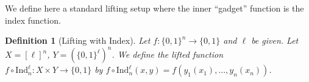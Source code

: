 \documentclass[11pt]{article}
\newtheorem{definition}{Definition}
\newcommand{\B}{\{0,1\}}
\begin{document}
We define here a standard lifting setup where the inner ``gadget'' function is the index function.%
\begin{definition}[Lifting with Index]
Let $f: \B^n \to \B$ and $\ell$ be given. Let $X = [\ell]^n$, $Y = (\B^\ell)^n$. We define the lifted function $f \circ \mathrm{Ind}_n^\ell: X \times Y \to \B$ by $f \circ \mathrm{Ind}_n^\ell(x,y) = f(y_1(x_1),\ldots,y_n(x_n))$. 
\end{definition}
\end{document}
